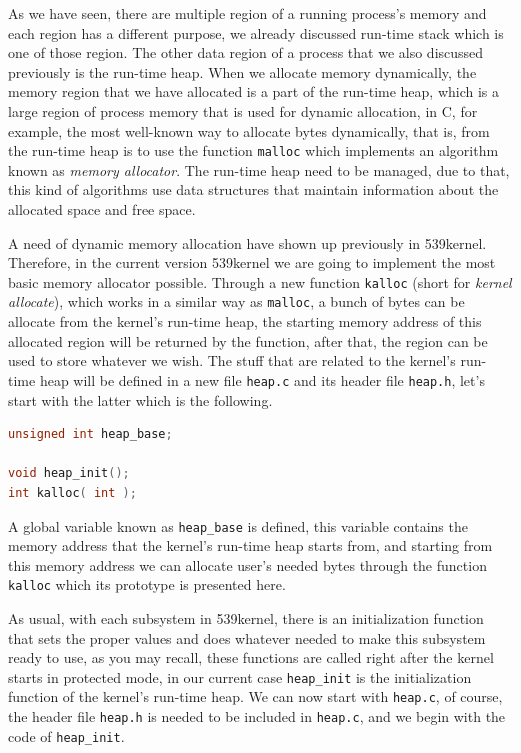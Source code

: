 As we have seen, there are multiple region of a running process's memory
and each region has a different purpose, we already discussed run-time
stack which is one of those region. The other data region of a process
that we also discussed previously is the run-time heap. When we allocate
memory dynamically, the memory region that we have allocated is a part
of the run-time heap, which is a large region of process memory that is
used for dynamic allocation, in C, for example, the most well-known way
to allocate bytes dynamically, that is, from the run-time heap is to use
the function \lstinline!malloc! which implements an algorithm known as
\emph{memory allocator}. The run-time heap need to be managed, due to
that, this kind of algorithms use data structures that maintain
information about the allocated space and free space.

A need of dynamic memory allocation have shown up previously in
539kernel. Therefore, in the current version 539kernel we are going to
implement the most basic memory allocator possible. Through a new
function \lstinline!kalloc! (short for \emph{kernel allocate}), which
works in a similar way as \lstinline!malloc!, a bunch of bytes can be
allocate from the kernel's run-time heap, the starting memory address of
this allocated region will be returned by the function, after that, the
region can be used to store whatever we wish. The stuff that are related
to the kernel's run-time heap will be defined in a new file
\lstinline!heap.c! and its header file \lstinline!heap.h!, let's start
with the latter which is the following.

\begin{lstlisting}[language=C]
unsigned int heap_base;

void heap_init();
int kalloc( int );
\end{lstlisting}

A global variable known as \lstinline!heap_base! is defined, this
variable contains the memory address that the kernel's run-time heap
starts from, and starting from this memory address we can allocate
user's needed bytes through the function \lstinline!kalloc! which its
prototype is presented here.

As usual, with each subsystem in 539kernel, there is an initialization
function that sets the proper values and does whatever needed to make
this subsystem ready to use, as you may recall, these functions are
called right after the kernel starts in protected mode, in our current
case \lstinline!heap_init! is the initialization function of the
kernel's run-time heap. We can now start with \lstinline!heap.c!, of
course, the header file \lstinline!heap.h! is needed to be included in
\lstinline!heap.c!, and we begin with the code of \lstinline!heap_init!.

